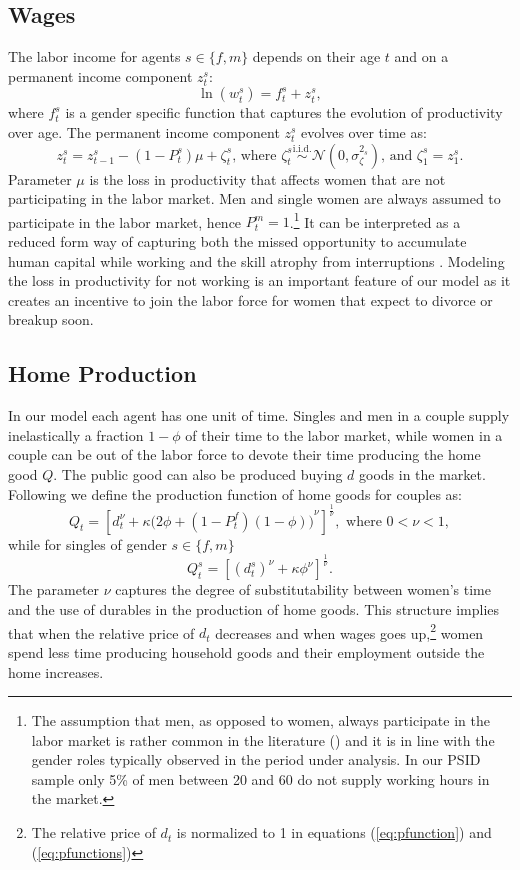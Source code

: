 \documentclass[12pt]{article}
\numberwithin{table}{section}
\begin{document}
\subsection{Wages}
The labor income for agents $s\in\{f,m\}$ depends on their age $t$ and on a permanent income component $z^s_t$:
\[\ln(w^s_t)=f^s_t+z^s_t,\]
where $f^s_t$ is a gender specific function that captures the evolution of productivity over age. The permanent income component  $z^s_t$ evolves over time as:
\begin{equation}\label{eq:pcomp}
z^s_t=z^s_{t-1}-(1-P_t^s) \mu+\zeta^s_{t}\text{, where }\zeta^s_{t}\overset{\text{i.i.d.}}{\sim}\mathcal{N}(0,\sigma_\zeta^{2_s})\text{, and }\zeta^s_{1}=z^s_{1}.
\end{equation}
Parameter $\mu$ is the loss in productivity that affects women that are not participating in the labor market. Men and single women are always assumed to participate in the labor market, hence $P^m_t=1$.\footnote{The assumption that men, as opposed to women, always participate in the labor market is rather common in the literature (\citealp{ciscato2019,low2018,voena2015}) and it is in line with the gender roles typically observed in the period under analysis. In our PSID sample only 5\% of men between 20 and 60 do not supply working hours in the market.} It can be interpreted as a reduced form way of capturing both the missed opportunity to accumulate human capital while working and the skill atrophy from interruptions \citep{adda2017}. Modeling the loss in productivity for not working is an important feature of our model as it creates an incentive to join the labor force for women that expect to divorce or breakup soon. 
\subsection{Home Production}
In our model each agent has one unit of time. Singles and men in a couple supply inelastically a fraction $1-\phi$ of their time to the labor market, while women in a couple can be out of the labor force to devote their time producing the home good $Q$. The public good can also be produced buying $d$ goods in the market. Following \cite{greenwood2016} we define the production function of home goods for couples as:
\begin{equation}\label{eq:pfunction}
Q_t=[d_t^\nu+\kappa ({2\phi+(1-P^f_t)(1-\phi))}^\nu]^{\frac{1}{\nu}}, \text{ where }0<\nu<1,
\end{equation}
while for singles of gender $s\in\{f,m\}$
\begin{equation}\label{eq:pfunctions}
Q^s_t=[(d^s_t)^\nu+\kappa \phi^\nu]^{\frac{1}{\nu}}.
\end{equation}
The parameter $\nu$ captures the degree of substitutability between women's time and the use of durables in the production of home goods. This structure implies that when the relative price of $d_t$ decreases and when wages goes up,\footnote{The relative price of $d_t$ is normalized to 1 in equations (\ref{eq:pfunction}) and (\ref{eq:pfunctions})} women spend less time producing household goods and their employment outside the home increases.
\end{document}
